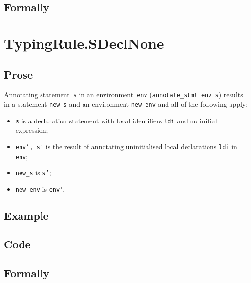 \documentclass{book}
\begin{document}
\begin{emptyformal}
    \subsection{Formally}
\end{emptyformal}


\section{TypingRule.SDeclNone \label{sec:TypingRule.SDeclNone}}

  \subsection{Prose}
Annotating statement~\texttt{s} in an environment~\texttt{env}
(\texttt{annotate\_stmt env s}) results in a statement \texttt{new\_s} and an
environment \texttt{new\_env} and all of the following apply:
   \begin{itemize}
   \item \texttt{s} is a declaration statement with local identifiers \texttt{ldi} and no initial expression;
   \item \texttt{env', s'} is the result of annotating uninitialised local declarations \texttt{ldi} in \texttt{env};
   \item \texttt{new\_s} is \texttt{s'};
   \item \texttt{new\_env} is \texttt{env'}.
   \end{itemize}

  \subsection{Example}

  \subsection{Code}

\begin{emptyformal}
    \subsection{Formally}
\end{emptyformal}
\end{document}
